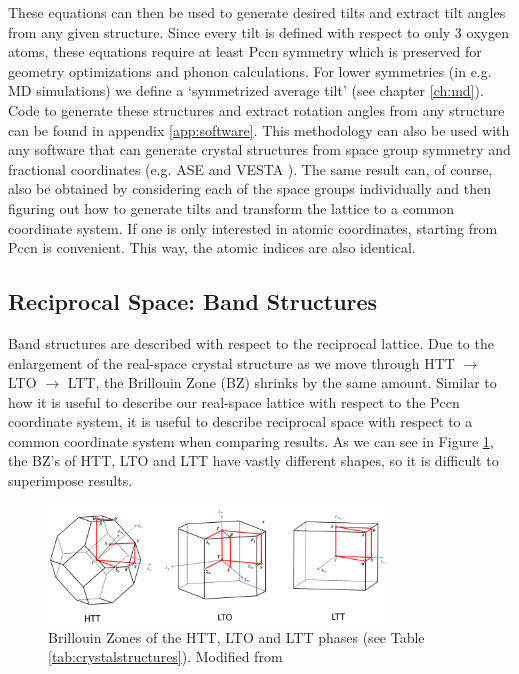 \noindent These equations can then be used to generate desired tilts and extract tilt angles from any given structure. Since every tilt is defined with respect to only 3 oxygen atoms, these equations require at least Pccn symmetry which is preserved for geometry optimizations and phonon calculations. For lower symmetries (in e.g. MD simulations) we define a `symmetrized average tilt' (see chapter \ref{ch:md}). Code to generate these structures and extract rotation angles from any structure can be found in appendix \ref{app:software}. This methodology can also be used with any software that can generate crystal structures from space group symmetry and fractional coordinates (e.g. ASE \cite{Larsen2017} and VESTA \cite{Momma2008}). The same result can, of course, also be obtained by considering each of the space groups individually and then figuring out how to generate tilts and transform the lattice to a common coordinate system. If one is only interested in atomic coordinates, starting from Pccn is convenient. This way, the atomic indices are also identical.

\subsection{Reciprocal Space: Band Structures}
Band structures are described with respect to the reciprocal lattice. Due to the enlargement of the real-space crystal structure as we move through HTT $\rightarrow$ LTO $\rightarrow$ LTT, the Brillouin Zone (BZ) shrinks by the same amount. Similar to how it is useful to describe our real-space lattice with respect to the Pccn coordinate system, it is useful to describe reciprocal space with respect to a common coordinate system when comparing results. As we can see in Figure \ref{fig:allbz}, the BZ's of HTT, LTO and LTT have vastly different shapes, so it is difficult to superimpose results.

\begin{figure}
	\centering
	\includegraphics[width=0.8\textwidth]{fig/simulation/BZAll.png}
	\caption[HTT LTO LTT BZs]{Brillouin Zones of the HTT, LTO and LTT phases (see Table \ref{tab:crystalstructures}). Modified from \cite{Hinuma2017}}
	\label{fig:allbz}
\end{figure}


